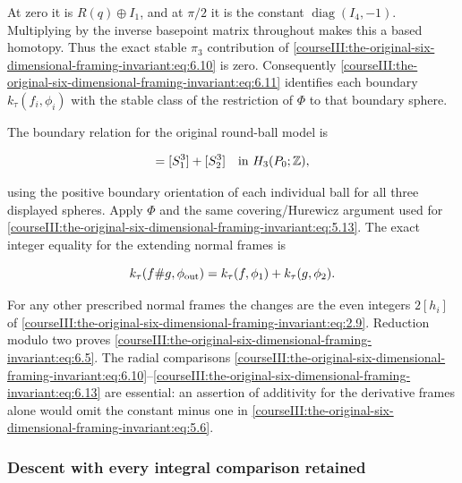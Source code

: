 At zero it is \(R(q)\oplus I_1\), and at \(\pi/2\) it is the constant \(\operatorname{diag}(I_4,-1)\). Multiplying by the inverse basepoint matrix throughout makes this a based homotopy. Thus the exact stable \(\pi_3\) contribution of \eqref{courseIII:the-original-six-dimensional-framing-invariant:eq:6.10} is zero. Consequently \eqref{courseIII:the-original-six-dimensional-framing-invariant:eq:6.11} identifies each boundary \(k_\tau(f_i,\phi_i)\) with the stable class of the restriction of \(\Phi\) to that boundary sphere.

The boundary relation for the original round-ball model is

\begin{equation}
[S_{\rm out}^3]=[S_1^3]+[S_2^3]
                       \quad\hbox{in }H_3(P_0;\mathbb Z),
 \label{courseIII:the-original-six-dimensional-framing-invariant:eq:6.14}
\end{equation}

using the positive boundary orientation of each individual ball for all three displayed spheres. Apply \(\Phi\) and the same covering/Hurewicz argument used for \eqref{courseIII:the-original-six-dimensional-framing-invariant:eq:5.13}. The exact integer equality for the extending normal frames is

\begin{equation}
k_\tau(f\#g,\phi_{\rm out})
                      =k_\tau(f,\phi_1)+k_\tau(g,\phi_2).
 \label{courseIII:the-original-six-dimensional-framing-invariant:eq:6.15}
\end{equation}

For any other prescribed normal frames the changes are the even integers \(2[h_i]\) of \eqref{courseIII:the-original-six-dimensional-framing-invariant:eq:2.9}. Reduction modulo two proves \eqref{courseIII:the-original-six-dimensional-framing-invariant:eq:6.5}. The radial comparisons \eqref{courseIII:the-original-six-dimensional-framing-invariant:eq:6.10}--\eqref{courseIII:the-original-six-dimensional-framing-invariant:eq:6.13} are essential: an assertion of additivity for the derivative frames alone would omit the constant minus one in \eqref{courseIII:the-original-six-dimensional-framing-invariant:eq:5.6}.

\subsubsection{Descent with every integral comparison retained}
\label{courseIII:the-original-six-dimensional-framing-invariant:section-6.3}

